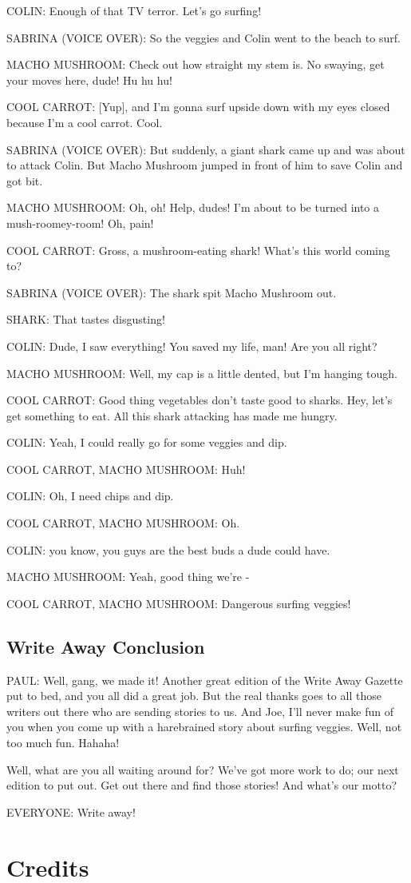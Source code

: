 COLIN:
Enough of that TV terror.
Let's go surfing!

SABRINA (VOICE OVER):
So the veggies and Colin went to the beach to surf.

MACHO MUSHROOM:
Check out how straight my stem is.
No swaying, get your moves here, dude!
Hu hu hu!

COOL CARROT:
[Yup], and I'm gonna surf upside down with my eyes closed because I'm a cool carrot.
Cool.

SABRINA (VOICE OVER):
But suddenly, a giant shark came up and was about to attack Colin.
But Macho Mushroom jumped in front of him to save Colin and got bit.

MACHO MUSHROOM:
Oh, oh!
Help, dudes!
I'm about to be turned into a mush-roomey-room!
Oh, pain!

COOL CARROT:
Gross, a mushroom-eating shark!
What's this world coming to?

SABRINA (VOICE OVER):
The shark spit Macho Mushroom out.

SHARK:
That tastes disgusting!

COLIN:
Dude, I saw everything!
You saved my life, man!
Are you all right?

MACHO MUSHROOM:
Well, my cap is a little dented, but I'm hanging tough.

COOL CARROT:
Good thing vegetables don't taste good to sharks.
Hey, let's get something to eat.
All this shark attacking has made me hungry.

COLIN:
Yeah, I could really go for some veggies and dip.

COOL CARROT, MACHO MUSHROOM:
Huh!

COLIN:
Oh, I need chips and dip.

COOL CARROT, MACHO MUSHROOM:
Oh.

COLIN:
you know, you guys are the best buds a dude could have.

MACHO MUSHROOM:
Yeah, good thing we're -

COOL CARROT, MACHO MUSHROOM:
Dangerous surfing veggies!

\subsection{Write Away Conclusion}

PAUL:
Well, gang, we made it!
Another great edition of the Write Away Gazette put to bed, and you all did a great job.
But the real thanks goes to all those writers out there who are sending stories to us.
And Joe, I'll never make fun of you when you come up with a harebrained story about surfing veggies.
Well, not too much fun.
Hahaha!

Well, what are you all waiting around for?
We've got more work to do; our next edition to put out.
Get out there and find those stories!
And what's our motto?

EVERYONE:
Write away!

\section{Credits}